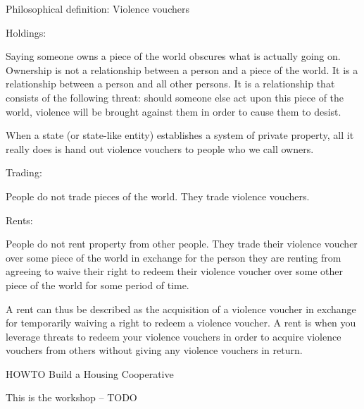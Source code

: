 \documentclass{article}
\begin{document}
\large Philosophical definition: Violence vouchers

\large Holdings:

Saying someone owns a piece of the world obscures what is actually going on. Ownership is not a relationship between a person and a piece of the world. It is a relationship between a person and all other persons. It is a relationship that consists of the following threat: should someone else act upon this piece of the world, violence will be brought against them in order to cause them to desist.

When a state (or state-like entity) establishes a system of private property, all it really does is hand out violence vouchers to people who we call owners. 

\large Trading:

People do not trade pieces of the world. They trade violence vouchers. 

\large Rents:

People do not rent property from other people. They trade their violence voucher over some piece of the world in exchange for the person they are renting from agreeing to waive their right to redeem their violence voucher over some other piece of the world for some period of time.

A rent can thus be described as the acquisition of a violence voucher in exchange for temporarily waiving a right to redeem a violence voucher. A rent is when you leverage threats to redeem your violence vouchers in order to acquire violence vouchers from others without giving any violence vouchers in return.


\pagebreak
\huge HOWTO Build a Housing Cooperative

This is the workshop -- TODO

\vspace{1cm}
\end{document}
